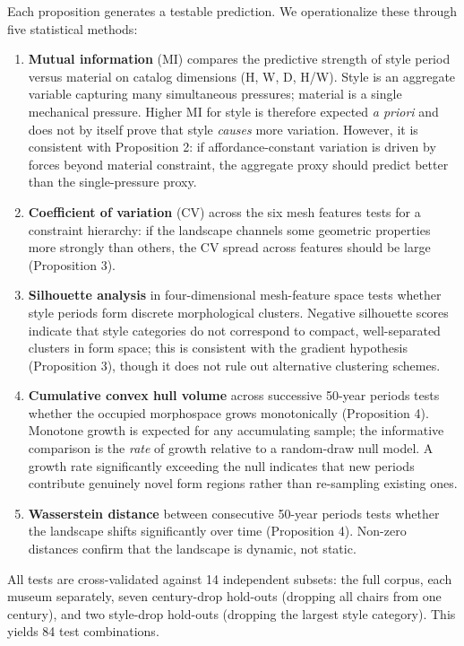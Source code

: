 Each proposition generates a testable prediction. We operationalize these through five statistical methods:

\begin{enumerate}
\item \textbf{Mutual information} (MI) compares the predictive strength of style period versus material on catalog dimensions (H, W, D, H/W). Style is an aggregate variable capturing many simultaneous pressures; material is a single mechanical pressure. Higher MI for style is therefore expected \textit{a priori} and does not by itself prove that style \textit{causes} more variation. However, it is consistent with Proposition 2: if affordance-constant variation is driven by forces beyond material constraint, the aggregate proxy should predict better than the single-pressure proxy.

\item \textbf{Coefficient of variation} (CV) across the six mesh features tests for a constraint hierarchy: if the landscape channels some geometric properties more strongly than others, the CV spread across features should be large (Proposition 3).

\item \textbf{Silhouette analysis} in four-dimensional mesh-feature space tests whether style periods form discrete morphological clusters. Negative silhouette scores indicate that style categories do not correspond to compact, well-separated clusters in form space; this is consistent with the gradient hypothesis (Proposition 3), though it does not rule out alternative clustering schemes.

\item \textbf{Cumulative convex hull volume} across successive 50-year periods tests whether the occupied morphospace grows monotonically (Proposition 4). Monotone growth is expected for any accumulating sample; the informative comparison is the \textit{rate} of growth relative to a random-draw null model. A growth rate significantly exceeding the null indicates that new periods contribute genuinely novel form regions rather than re-sampling existing ones.

\item \textbf{Wasserstein distance} between consecutive 50-year periods tests whether the landscape shifts significantly over time (Proposition 4). Non-zero distances confirm that the landscape is dynamic, not static.
\end{enumerate}

All tests are cross-validated against 14 independent subsets: the full corpus, each museum separately, seven century-drop hold-outs (dropping all chairs from one century), and two style-drop hold-outs (dropping the largest style category). This yields 84 test combinations.

